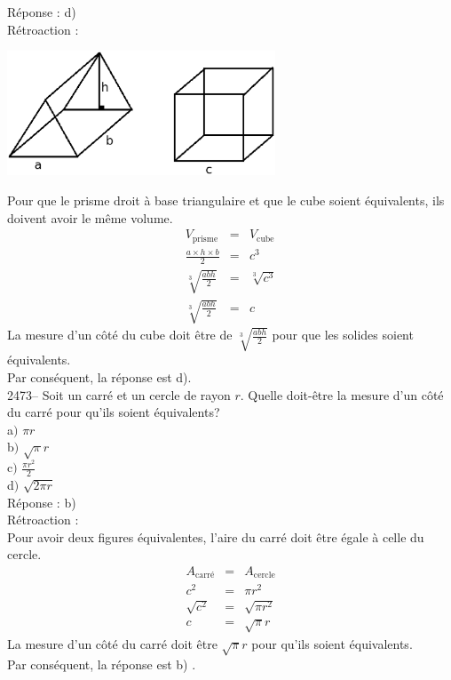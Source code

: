 \documentclass[letterpaper, 12pt]{article}
\begin{document}
R\'eponse : d)\\

R\'etroaction :
\begin{center}
 \includegraphics[width=8cm,bb=0 536 571 842]{Q2472.eps}
\end{center}
Pour que le prisme droit \`a base triangulaire et que le cube soient \'equivalents, ils doivent avoir le m\^eme volume.
\begin{eqnarray*}
  V_{\textrm{prisme}}&=&V_{\textrm{cube}}\\
 \frac{a\times h \times b }{2} &=&c^{3}\\
 \sqrt[3]{\frac{abh}{2} }&=&\sqrt[3]{c^{3}}\\
 \sqrt[3]{\frac{abh}{2} }&=&c
\end{eqnarray*}
La mesure d'un c\^ot\'e du cube doit \^etre de $\sqrt[3]{\frac{abh}{2} }$ pour que les solides soient \'equivalents.\\
Par cons\'equent, la r\'eponse est d).\\

2473-- Soit un carr\'e et un cercle de rayon $r$. Quelle doit-\^etre la mesure d'un c\^ot\'e du carr\'e pour qu'ils soient \'equivalents?\\

a$)$ $\pi r$\\[2mm]
b$)$ $\sqrt{\pi}r$\\[2mm]
c$)$ $\frac{\pi r^{2}}{2} $\\[2mm]
d$)$ $\sqrt{2\pi r}$\\[2mm]

R\'eponse : b)\\

R\'etroaction :\\
Pour avoir deux figures \'equivalentes, l'aire du carr\'e doit \^etre \'egale \`a celle du cercle.
\begin{eqnarray*}
 A_{\textrm{carr\'e}}&=&A_{\textrm{cercle}}\\
c^{2}&=&\pi r^{2}\\
\sqrt{c^{2}}&=&\sqrt{\pi r^{2}}\\
c&=&\sqrt{\pi }r
\end{eqnarray*}
La mesure d'un c\^ot\'e du carr\'e doit \^etre $\sqrt{\pi}r$ pour qu'ils soient \'equivalents. \\
Par cons\'equent, la r\'eponse est b) .\\
\end{document}

